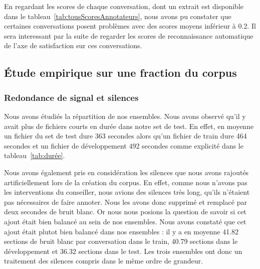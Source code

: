 En regardant les scores de chaque conversation, dont un extrait est disponible dans le tableau~\ref{tab:tousScoresAnnotateurs}, nous avons pu constater que certaines conversations posent problèmes avec des scores moyens inférieur à 0.2. Il sera interessant par la suite de regarder les scores de reconnaissance automatique de l'axe de satisfaction sur ces conversations.



\subsection{Étude empirique sur une fraction du corpus}

\subsubsection{Redondance de signal et silences}
Nous avons étudiés la répartition de nos ensembles. Nous avons observé qu'il y avait plus de fichiers courts en durée dans notre set de test. En effet, en moyenne un fichier du set de test dure 363 secondes alors qu'un fichier de train dure 464 secondes et un fichier de développement 492 secondes comme explicité dans le tableau~\ref{tab:durée}.


Nous avons également pris en considération les silences que nous avons rajoutés artificiellement lors de la création du corpus. En effet, comme nous n'avons pas les interventions du conseiller, nous avions des silences très long, qu'ils n'étaient pas nécessaires de faire annoter. Nous les avons donc supprimé et remplacé par deux secondes de bruit blanc. Or nous nous posions la question de savoir si cet ajout était bien balancé au sein de nos ensembles. Nous avons constaté que cet ajout était plutot bien balancé dans nos ensembles : il y a en moyenne 41.82 sections de bruit blanc par conversation dans le train, 40.79 sections dans le développement et 36.32 sections dans le test.
Les trois ensembles ont donc un traitement des silences compris dans le même ordre de grandeur.

